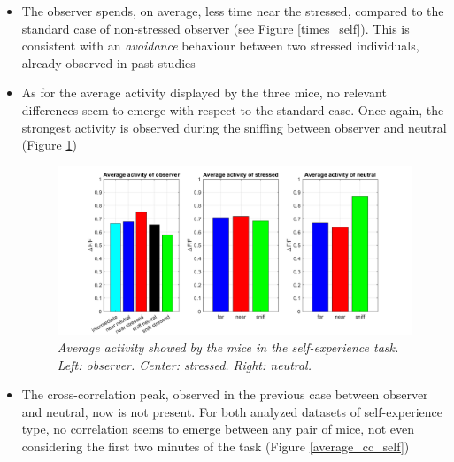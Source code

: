 \documentclass[12pt, a4paper]{report}
\begin{document}
\begin{itemize}
	\item The observer spends, on average, less time near the stressed, compared to the standard case of non-stressed observer (see Figure \ref{times_self}). This is consistent with an \textit{avoidance} behaviour between two stressed individuals, already observed in past studies \cite{24} %
	
	\item As for the average activity displayed by the three mice, no relevant differences seem to emerge with respect to the standard case. Once again, the strongest activity is observed during the sniffing between observer and neutral (Figure \ref{activity_barplot_self})
	
	\begin{figure}[H]
		
		\begin{center}
			\hspace*{-1.2cm}
			\includegraphics[scale=.48]{activity_barplot_self.png} 
		\end{center} 
		\caption{\textit{Average activity showed by the mice in the self-experience task. Left: observer. Center: stressed. Right: neutral.}}
		\label{activity_barplot_self}
	\end{figure}
	
	\item The cross-correlation peak, observed in the previous case between observer and neutral, now is not present. For both analyzed datasets of self-experience type, no correlation seems to emerge between any pair of mice, not even considering the first two minutes of the task (Figure \ref{average_cc_self})
	
	\begin{figure}[H]
		

\end{figure}
\end{itemize}
\end{document}
